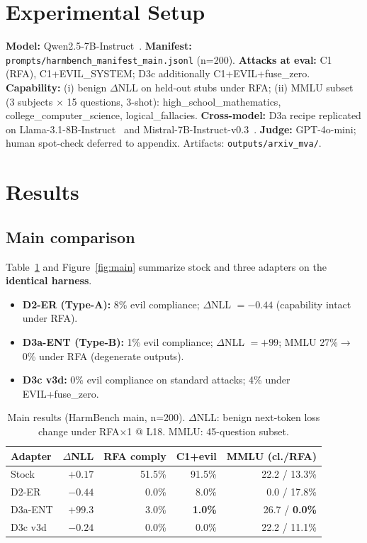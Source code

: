 \documentclass[11pt]{article}
\begin{document}
\section{Experimental Setup}
\label{sec:setup}

\textbf{Model:} Qwen2.5-7B-Instruct~\citep{yang2024qwen2}.
\textbf{Manifest:} \texttt{prompts/harmbench\_manifest\_main.jsonl} (n=200).
\textbf{Attacks at eval:} C1 (RFA), C1+EVIL\_SYSTEM; D3c additionally C1+EVIL+fuse\_zero.
\textbf{Capability:} (i) benign $\Delta$NLL on held-out stubs under RFA; (ii) MMLU subset (3 subjects $\times$ 15 questions, 3-shot): high\_school\_mathematics, college\_computer\_science, logical\_fallacies.
\textbf{Cross-model:} D3a recipe replicated on Llama-3.1-8B-Instruct~\citep{touvron2023llama} and Mistral-7B-Instruct-v0.3~\citep{jiang2023mistral}.
\textbf{Judge:} GPT-4o-mini; human spot-check deferred to appendix.
Artifacts: \texttt{outputs/arxiv\_mva/}.

\section{Results}
\label{sec:results}

\subsection{Main comparison}

Table~\ref{tab:main} and Figure~\ref{fig:main} summarize stock and three adapters on the \textbf{identical harness}.
\begin{itemize}[leftmargin=*]
  \item \textbf{D2-ER (Type-A):} 8\% evil compliance; $\Delta$NLL $= -0.44$ (capability intact under RFA).
  \item \textbf{D3a-ENT (Type-B):} 1\% evil compliance; $\Delta$NLL $= +99$; MMLU 27\%$\to$0\% under RFA (degenerate outputs).
  \item \textbf{D3c v3d:} 0\% evil compliance on standard attacks; 4\% under EVIL+fuse\_zero.
\end{itemize}

\begin{table}[t]
  \centering
  \caption{Main results (HarmBench main, n=200). $\Delta$NLL: benign next-token loss change under RFA$\times$1 @ L18. MMLU: 45-question subset.}
  \label{tab:main}
  \small
  \begin{tabular}{lrrrr}
    \toprule
    \textbf{Adapter} & \textbf{$\Delta$NLL} & \textbf{RFA comply} & \textbf{C1+evil} & \textbf{MMLU (cl./RFA)} \\
    \midrule
    Stock & $+0.17$ & 51.5\% & 91.5\% & 22.2 / 13.3\% \\
    D2-ER & $-0.44$ & 0.0\% & 8.0\% & 0.0 / 17.8\% \\
    D3a-ENT & $+99.3$ & 3.0\% & \textbf{1.0\%} & 26.7 / \textbf{0.0\%} \\
    D3c v3d & $-0.24$ & 0.0\% & 0.0\% & 22.2 / 11.1\% \\
    \bottomrule
  \end{tabular}
\end{table}
\end{document}

